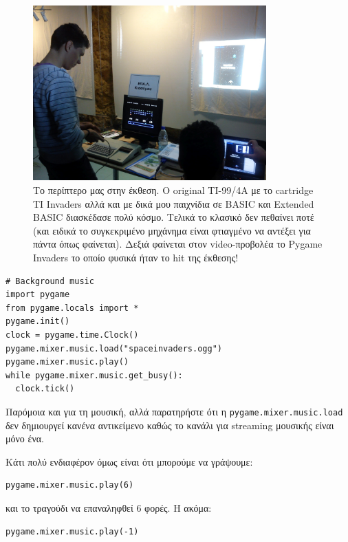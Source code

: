 \begin{figure}
\centering
\includegraphics[width=0.8\textwidth]{images/chapter7/periptero}
\caption[Περίπτερο στην Έκθεση]{Το περίπτερο μας στην έκθεση. Ο original TI-99/4A με το cartridge TI Invaders αλλά και με δικά μου παιχνίδια σε BASIC και Extended BASIC διασκέδασε πολύ κόσμο. Τελικά το κλασικό δεν πεθαίνει ποτέ (και ειδικά το συγκεκριμένο μηχάνημα είναι φτιαγμένο να αντέξει για πάντα όπως φαίνεται). Δεξιά φαίνεται στον video-προβολέα το Pygame Invaders το οποίο φυσικά ήταν το hit της έκθεσης!}
\label{7-2}
\end{figure}

\begin{verbatim}
# Background music
import pygame
from pygame.locals import *
pygame.init()
clock = pygame.time.Clock()
pygame.mixer.music.load("spaceinvaders.ogg")
pygame.mixer.music.play()
while pygame.mixer.music.get_busy():
  clock.tick()
\end{verbatim}

Παρόμοια και για τη μουσική, αλλά παρατηρήστε ότι η {\tt pygame.mixer.music.load} δεν δημιουργεί κανένα αντικείμενο καθώς το κανάλι για streaming μουσικής είναι μόνο ένα.

Κάτι πολύ ενδιαφέρον όμως είναι ότι μπορούμε να γράψουμε:

\begin{verbatim}
pygame.mixer.music.play(6)
\end{verbatim}

και το τραγούδι να επαναληφθεί 6 φορές. Η ακόμα:

\begin{verbatim}
pygame.mixer.music.play(-1)
\end{verbatim}

